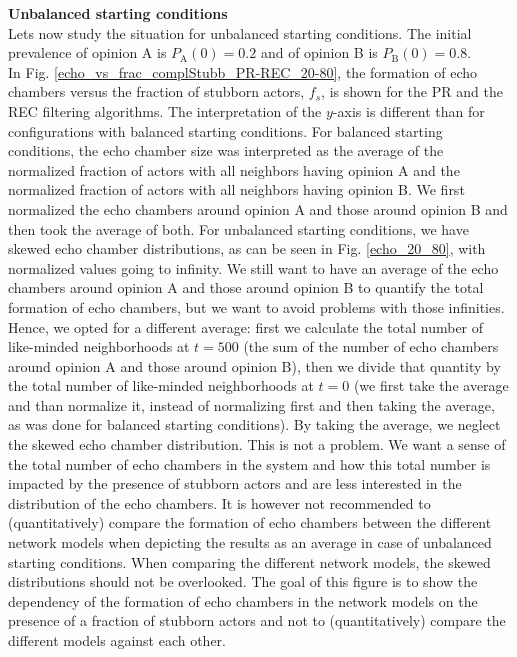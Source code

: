 \documentclass[11 pt , letterpaper , twoside , openright]{book}
\begin{document}
\newline
\textbf{Unbalanced starting conditions}\\
\newline
Lets now study the situation for unbalanced starting conditions. The initial prevalence of opinion A is $P_\text{A}(0) = 0.2$ and of opinion B is $P_\text{B}(0) = 0.8$.\\
\newline
In Fig. \ref{echo_vs_frac_complStubb_PR-REC_20-80}, the formation of echo chambers versus the fraction of stubborn actors, $f_s$, is shown for the PR and the REC filtering algorithms. The interpretation of the $y$-axis is different than for configurations with balanced starting conditions. For balanced starting conditions, the echo chamber size was interpreted as the average of the normalized fraction of actors with all neighbors having opinion A and the normalized fraction of actors with all neighbors having opinion B. We first normalized the echo chambers around opinion A and those around opinion B and then took the average of both. For unbalanced starting conditions, we have skewed echo chamber distributions, as can be seen in Fig. \ref{echo_20_80}, with normalized values going to infinity. We still want to have an average of the echo chambers around opinion A and those around opinion B to quantify the total formation of echo chambers, but we want to avoid problems with those infinities. Hence, we opted for a different average: first we calculate the total number of like-minded neighborhoods at $t=500$ (the sum of the number of echo chambers around opinion A and those around opinion B), then we divide that quantity by the total number of like-minded neighborhoods at $t=0$ (we first take the average and than normalize it, instead of normalizing first and then taking the average, as was done for balanced starting conditions). By taking the average, we neglect the skewed echo chamber distribution. This is not a problem. We want a sense of the total number of echo chambers in the system and how this total number is impacted by the presence of stubborn actors and are less interested in the distribution of the echo chambers.  It is however not recommended to (quantitatively) compare the formation of echo chambers between the different network models when depicting the results as an average in case of unbalanced starting conditions. When comparing the different network models, the skewed distributions should not be overlooked. The goal of this figure is to show the dependency of the formation of echo chambers in the network models on the presence of a fraction of stubborn actors and not to (quantitatively) compare the different models against each other.
\end{document}
